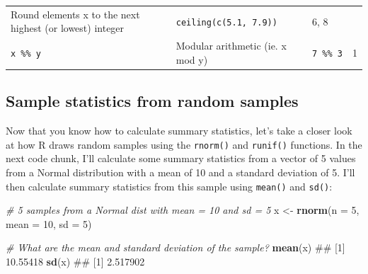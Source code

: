 \documentclass[]{book}
\newenvironment{Shaded}{\begin{snugshade}}{\end{snugshade}}
\newcommand{\KeywordTok}[1]{\textcolor[rgb]{0.13,0.29,0.53}{\textbf{#1}}}
\newcommand{\DataTypeTok}[1]{\textcolor[rgb]{0.13,0.29,0.53}{#1}}
\newcommand{\DecValTok}[1]{\textcolor[rgb]{0.00,0.00,0.81}{#1}}
\newcommand{\StringTok}[1]{\textcolor[rgb]{0.31,0.60,0.02}{#1}}
\newcommand{\CommentTok}[1]{\textcolor[rgb]{0.56,0.35,0.01}{\textit{#1}}}
\newcommand{\NormalTok}[1]{#1}
\theoremstyle{definition}
\theoremstyle{definition}
\theoremstyle{remark}
\begin{document}
\begin{longtable}[]{@{}llll@{}}
\begin{minipage}[t]{0.24\columnwidth}
Round elements x to the next highest (or lowest) integer\strut
\end{minipage} & \begin{minipage}[t]{0.33\columnwidth}\raggedright\strut
\texttt{ceiling(c(5.1,\ 7.9))}\strut
\end{minipage} & \begin{minipage}[t]{0.15\columnwidth}\raggedright\strut
6, 8\strut
\end{minipage}\tabularnewline
\begin{minipage}[t]{0.17\columnwidth}\raggedright\strut
\texttt{x\ \%\%\ y}\strut
\end{minipage} & \begin{minipage}[t]{0.24\columnwidth}\raggedright\strut
Modular arithmetic (ie. x mod y)\strut
\end{minipage} & \begin{minipage}[t]{0.33\columnwidth}\raggedright\strut
\texttt{7\ \%\%\ 3}\strut
\end{minipage} & \begin{minipage}[t]{0.15\columnwidth}\raggedright\strut
1\strut
\end{minipage}\tabularnewline
\bottomrule
\end{longtable}

\subsection{Sample statistics from random
samples}\label{sample-statistics-from-random-samples}

Now that you know how to calculate summary statistics, let's take a
closer look at how R draws random samples using the \texttt{rnorm()} and
\texttt{runif()} functions. In the next code chunk, I'll calculate some
summary statistics from a vector of 5 values from a Normal distribution
with a mean of 10 and a standard deviation of 5. I'll then calculate
summary statistics from this sample using \texttt{mean()} and
\texttt{sd()}:

\begin{Shaded}
\begin{Highlighting}[]
\CommentTok{# 5 samples from a Normal dist with mean = 10 and sd = 5}
\NormalTok{x <-}\StringTok{ }\KeywordTok{rnorm}\NormalTok{(}\DataTypeTok{n =} \DecValTok{5}\NormalTok{, }\DataTypeTok{mean =} \DecValTok{10}\NormalTok{, }\DataTypeTok{sd =} \DecValTok{5}\NormalTok{)}

\CommentTok{# What are the mean and standard deviation of the sample?}
\KeywordTok{mean}\NormalTok{(x)}
\NormalTok{## [1] 10.55418}
\KeywordTok{sd}\NormalTok{(x)}
\NormalTok{## [1] 2.517902}
\end{Highlighting}
\end{Shaded}
\end{document}
